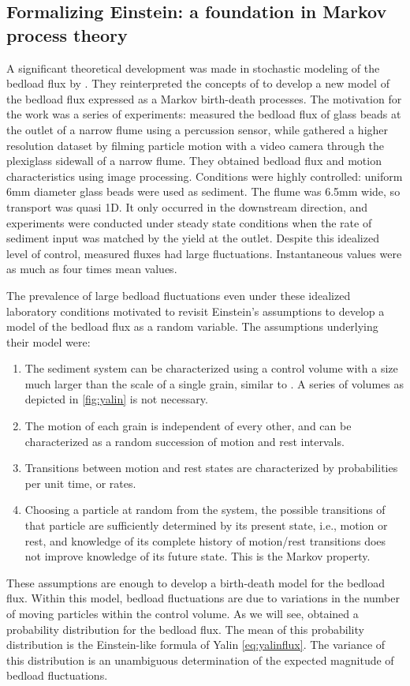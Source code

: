 \subsection{Formalizing Einstein: a foundation in Markov process theory} 
\label{sec:ancey2006} 

A significant theoretical development was made in stochastic modeling of the bedload flux by \citet{Ancey2006}. 
They reinterpreted the concepts of \citet{Einstein1950} to develop a new model of the bedload flux expressed as a Markov birth-death processes. 
The motivation for the \citet{Ancey2006} work was a series of experiments: \citet{Bohm2004} measured the bedload flux of glass beads at the outlet of a narrow flume using a percussion sensor, while \citet{Ancey2006} gathered a higher resolution dataset by filming particle motion with a video camera through the plexiglass sidewall of a narrow flume. 
They obtained bedload flux and motion characteristics using image processing. 
Conditions were highly controlled: uniform 6mm diameter glass beads were used as sediment. The flume was 6.5mm wide, so transport was quasi 1D. 
It only occurred in the downstream direction, and experiments were conducted under steady state conditions when the rate of sediment input was matched by the yield at the outlet. 
Despite this idealized level of control, measured fluxes had large fluctuations. 
Instantaneous values were as much as four times mean values. 

The prevalence of large bedload fluctuations even under these idealized laboratory conditions motivated \citet{Ancey2006} to revisit Einstein's assumptions to develop a model of the bedload flux as a random variable. 
The assumptions underlying their model were: 
\begin{enumerate}
\item The sediment system can be characterized using a control volume with a size much larger than the scale of a single grain, similar to \citet{Einstein1950}. A series of volumes as depicted in \ref{fig:yalin} is not necessary.
\item The motion of each grain is independent of every other, and can be characterized as a random succession of motion and rest intervals. 
\item Transitions between motion and rest states are characterized by probabilities per unit time, or rates. 
\item Choosing a particle at random from the system, the possible transitions of that particle are sufficiently determined by its present state, i.e., motion or rest, and knowledge of its complete history of motion/rest transitions does not improve knowledge of its future state. This is the Markov property. 
\end{enumerate}
These assumptions are enough to develop a birth-death model for the bedload flux. 
Within this model, bedload fluctuations are due to variations in the number of moving particles within the control volume. 
As we will see, \citet{Ancey2006} obtained a probability distribution for the bedload flux. 
The mean of this probability distribution is the Einstein-like formula of Yalin \ref{eq:yalinflux}.  
The variance of this distribution is an unambiguous determination of the expected magnitude of bedload fluctuations. 

